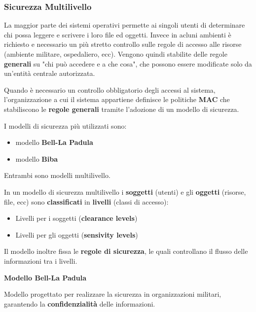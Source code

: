 \documentclass{article}
\begin{document}
\subsubsection{Sicurezza Multilivello}

La maggior parte dei sistemi operativi permette ai singoli utenti di determinare chi possa leggere e scrivere i loro file ed oggetti. Invece in acluni ambienti
è richiesto e necessario un più stretto controllo sulle regole di accesso alle risorse (ambiente militare, ospedaliero, ecc). Vengono quindi stabilite delle regole
\textbf{generali} su "chi può accedere e a che cosa", che possono essere modificate solo da un'entità centrale autorizzata.

Quando è necessario un controllo obbligatorio degli accessi al sistema, l'organizzazione a cui il sistema appartiene definisce le politiche \textbf{MAC} che
stabiliscono le \textbf{regole generali} tramite l'adozione di un modello di sicurezza.

\vspace{3mm}
I modelli di sicurezza più utilizzati sono:
\begin{itemize}
    \item modello \textbf{Bell-La Padula}
    \item modello \textbf{Biba}
\end{itemize}

Entrambi sono modelli multilivello.

\vspace{3mm}
In un modello di sicurezza multilivello i \textbf{soggetti} (utenti) e gli \textbf{oggetti} (risorse, file, ecc) sono \textbf{classificati} in \textbf{livelli} (classi
di accesso):
\begin{itemize}
    \item Livelli per i soggetti (\textbf{clearance levels})
    \item Livelli per gli oggetti (\textbf{sensivity levels})
\end{itemize}

\vspace{3mm}
Il modello inoltre fissa le \textbf{regole di sicurezza}, le quali controllano il flusso delle informazioni tra i livelli.

\vspace{3mm}
\textbf{Modello Bell-La Padula}
\vspace{3mm}

Modello progettato per realizzare la sicurezza in organizzazioni militari, garantendo la \textbf{confidenzialità} delle informazioni.
\end{document}
